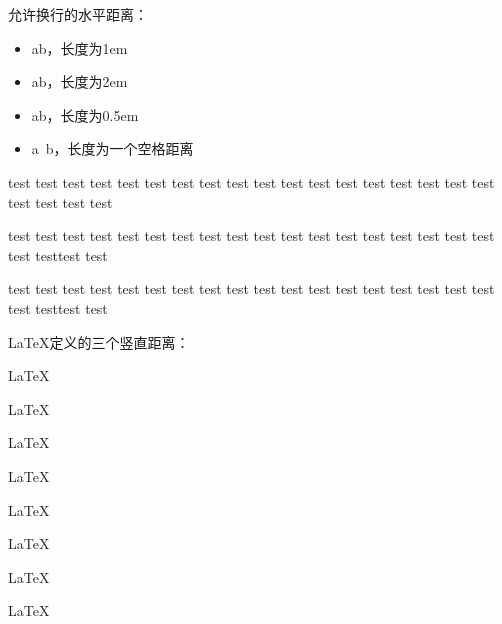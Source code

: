 \documentclass[twoside]{ctexart}
\begin{document}
            允许换行的水平距离：
            \begin{itemize}
                \item a\quad b，长度为1em
                \item a\qquad b，长度为2em
                \item a\enskip b，长度为0.5em
                \item a\ b，长度为一个空格距离
            \end{itemize}

            test test test test test test test test test test test test test test test test test test test test test test

            test test test test test test test test test test test test test test test test test test test test\enspace test test 

            test test test test test test test test test test test test test test test test test test test test\enskip test test 

            LaTeX定义的三个竖直距离：

            \parbox[t]{.2\textwidth}{\LaTeX\par \LaTeX}
            \parbox[t]{.2\textwidth}{\LaTeX\par\smallskip \LaTeX}
            \parbox[t]{.2\textwidth}{\LaTeX\par\medskip \LaTeX}
            \parbox[t]{.2\textwidth}{\LaTeX\par\bigskip \LaTeX}
\end{document}
